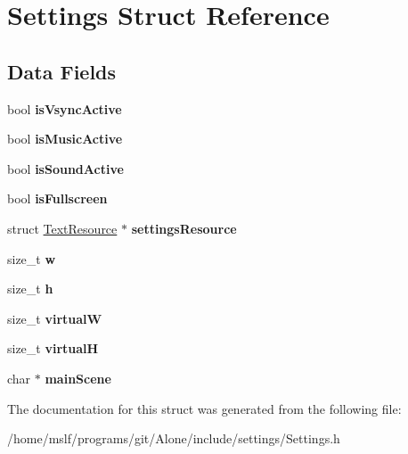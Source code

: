 \hypertarget{struct_settings}{}\section{Settings Struct Reference}
\label{struct_settings}
\subsection*{Data Fields}
\begin{DoxyCompactItemize}
\item 
\hypertarget{struct_settings_a268770171cd0fa68cd268fa1b0ee8c6a}{}\label{struct_settings_a268770171cd0fa68cd268fa1b0ee8c6a} 
bool {\bfseries is\+Vsync\+Active}
\item 
\hypertarget{struct_settings_abc26db848e0a6faf8a443fefaeb42f50}{}\label{struct_settings_abc26db848e0a6faf8a443fefaeb42f50} 
bool {\bfseries is\+Music\+Active}
\item 
\hypertarget{struct_settings_a5c6626343a76aeeea67da93f5e14fd45}{}\label{struct_settings_a5c6626343a76aeeea67da93f5e14fd45} 
bool {\bfseries is\+Sound\+Active}
\item 
\hypertarget{struct_settings_acf2d18d9a8396938ecf48c975f249e71}{}\label{struct_settings_acf2d18d9a8396938ecf48c975f249e71} 
bool {\bfseries is\+Fullscreen}
\item 
\hypertarget{struct_settings_a9f3a9508bd2e43d9a051067b855f3f4f}{}\label{struct_settings_a9f3a9508bd2e43d9a051067b855f3f4f} 
struct \hyperlink{struct_text_resource}{Text\+Resource} $\ast$ {\bfseries settings\+Resource}
\item 
\hypertarget{struct_settings_a48fb479f577f4e88da921cb511d29d87}{}\label{struct_settings_a48fb479f577f4e88da921cb511d29d87} 
size\+\_\+t {\bfseries w}
\item 
\hypertarget{struct_settings_a546c9e6b0a432bcc3cca32e80295a124}{}\label{struct_settings_a546c9e6b0a432bcc3cca32e80295a124} 
size\+\_\+t {\bfseries h}
\item 
\hypertarget{struct_settings_adc24b464ceae12a03474e25a85a79975}{}\label{struct_settings_adc24b464ceae12a03474e25a85a79975} 
size\+\_\+t {\bfseries virtualW}
\item 
\hypertarget{struct_settings_a8b22abb35f29c94a6c569ac06eee9cf9}{}\label{struct_settings_a8b22abb35f29c94a6c569ac06eee9cf9} 
size\+\_\+t {\bfseries virtualH}
\item 
\hypertarget{struct_settings_a792a805526649e9370c1227e7f72ffd2}{}\label{struct_settings_a792a805526649e9370c1227e7f72ffd2} 
char $\ast$ {\bfseries main\+Scene}
\end{DoxyCompactItemize}


The documentation for this struct was generated from the following file\+:\begin{DoxyCompactItemize}
\item 
/home/mslf/programs/git/\+Alone/include/settings/Settings.\+h\end{DoxyCompactItemize}
